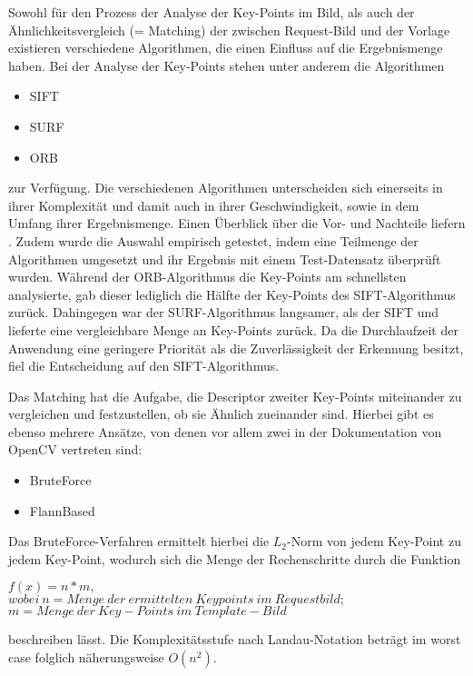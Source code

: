 \documentclass[
    type=Projektarbeit,
    status=draft, %
    language=german, %
    bibengine=bibtex,
]{unibwm-inf-thesis}
\begin{document}
    Sowohl für den Prozess der Analyse der Key-Points im Bild, als auch der Ähnlichkeitsvergleich (= Matching) der zwischen Request-Bild und der Vorlage
    existieren verschiedene Algorithmen, die einen Einfluss auf die Ergebnismenge haben.
    Bei der Analyse der Key-Points stehen unter anderem die Algorithmen
    \begin{itemize}
        \item SIFT
        \item SURF
        \item ORB
    \end{itemize}
    zur Verfügung.
    Die verschiedenen Algorithmen unterscheiden sich einerseits in ihrer Komplexität und damit auch in ihrer Geschwindigkeit, sowie in dem Umfang ihrer Ergebnismenge.
    Einen Überblick über die Vor- und Nachteile liefern \citet{Karami2017}.
    Zudem wurde die Auswahl empirisch getestet, indem eine Teilmenge der Algorithmen umgesetzt und ihr Ergebnis mit einem Test-Datensatz überprüft wurden.
    Während der ORB-Algorithmus die Key-Points am schnellsten analysierte, gab dieser lediglich die Hälfte der Key-Points des SIFT-Algorithmus zurück.
    Dahingegen war der SURF-Algorithmus langsamer, als der SIFT und lieferte eine vergleichbare Menge an Key-Points zurück.
    Da die Durchlaufzeit der Anwendung eine geringere Priorität als die Zuverlässigkeit der Erkennung besitzt, fiel die Entscheidung auf den SIFT-Algorithmus.

    Das Matching hat die Aufgabe, die Descriptor zweiter Key-Points miteinander zu vergleichen und festzustellen, ob sie Ähnlich zueinander sind.
    Hierbei gibt es ebenso mehrere Ansätze, von denen vor allem zwei in der Dokumentation von OpenCV vertreten sind:
    \begin{itemize}
        \item BruteForce
        \item FlannBased
    \end{itemize}

    Das BruteForce-Verfahren ermittelt hierbei die $L_{2}$-Norm von jedem Key-Point zu jedem Key-Point, wodurch sich die Menge der Rechenschritte durch die Funktion
\begin{center}
    $f(x) = n * m,$ \\
    $wobei~n= Menge~der~ermittelten~Keypoints~im~Requestbild;$\\
    $m = Menge~der~Key-Points~im~Template-Bild$\\
\end{center}
    beschreiben lässt.
    Die Komplexitätsstufe nach Landau-Notation beträgt im worst case folglich näherungsweise $O(n^{2})$.
\end{document}
